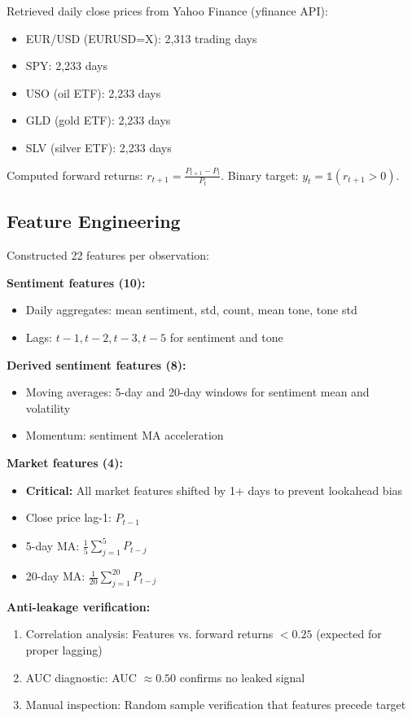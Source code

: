 \documentclass[11pt]{article}
\begin{document}
Retrieved daily close prices from Yahoo Finance (yfinance API):
\begin{itemize}
    \item EUR/USD (EURUSD=X): 2,313 trading days
    \item SPY: 2,233 days
    \item USO (oil ETF): 2,233 days
    \item GLD (gold ETF): 2,233 days
    \item SLV (silver ETF): 2,233 days
\end{itemize}

Computed forward returns: $r_{t+1} = \frac{P_{t+1} - P_t}{P_t}$. Binary target: $y_t = \mathbb{1}(r_{t+1} > 0)$.

\subsection{Feature Engineering}

Constructed 22 features per observation:

\textbf{Sentiment features (10):}
\begin{itemize}
    \item Daily aggregates: mean sentiment, std, count, mean tone, tone std
    \item Lags: $t-1, t-2, t-3, t-5$ for sentiment and tone
\end{itemize}

\textbf{Derived sentiment features (8):}
\begin{itemize}
    \item Moving averages: 5-day and 20-day windows for sentiment mean and volatility
    \item Momentum: sentiment MA acceleration
\end{itemize}

\textbf{Market features (4):}
\begin{itemize}
    \item \textbf{Critical:} All market features shifted by 1+ days to prevent lookahead bias
    \item Close price lag-1: $P_{t-1}$
    \item 5-day MA: $\frac{1}{5}\sum_{j=1}^{5}P_{t-j}$
    \item 20-day MA: $\frac{1}{20}\sum_{j=1}^{20}P_{t-j}$
\end{itemize}

\textbf{Anti-leakage verification:}
\begin{enumerate}
    \item Correlation analysis: Features vs. forward returns $< 0.25$ (expected for proper lagging)
    \item AUC diagnostic: AUC $\approx 0.50$ confirms no leaked signal
    \item Manual inspection: Random sample verification that features precede target
\end{enumerate}
\end{document}
